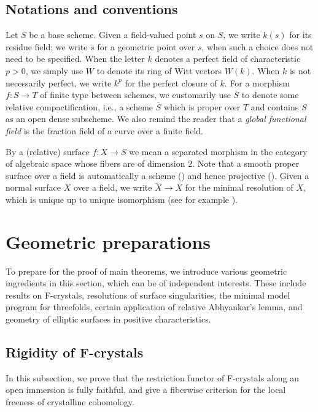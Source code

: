 \documentclass[11pt, letterpaper]{amsart}
\theoremstyle{plain}
\theoremstyle{definition}
\newcommand{\<}{\langle}
\renewcommand{\>}{\rangle}
\begin{document}
\subsection{Notations and conventions} 
Let $S$ be a base scheme. 
Given a field-valued point $s$ on $S$, we write $k(s)$ for its residue field; we write $\bar{s}$ for a geometric point over $s$, when such a choice does not need to be specified. 
When the letter $k$ denotes a perfect field of characteristic $p > 0$, we simply use $W$ to denote its ring of Witt vectors $W(k)$. 
When $k$ is not necessarily perfect, we write $k^p$ for the perfect closure of $k$.
For a morphism $f : S \to T$ of finite type between schemes, we customarily use $\overline{S}$ to denote some relative compactification, i.e., a scheme $\overline{S}$ which is proper over $T$ and contains $S$ as an open dense subscheme.
We also remind the reader that a \emph{global functional field} is the fraction field of a curve over a finite field.

By a (relative) surface $f : X \to S$ we mean a separated morphism in the category of algebraic space whose fibers are of dimension $2$. 
Note that a smooth proper surface over a field is automatically a scheme (\cite[Thm~4.7]{Artin-AS}) and hence projective (\cite[p.~328, Cor.~4]{Kl66}). 
Given a normal surface $X$ over a field, we write $\breve{X} \to X$ for the minimal resolution of $X$, which is unique up to unique isomorphism (see for example \cite[\S9.3.4, Prop.~3.32]{LiuBook}). 


\section{Geometric preparations}
To prepare for the proof of main theorems, we introduce various geometric ingredients in this section, which can be of independent interests.
These include results on F-crystals, resolutions of surface singularities, the minimal model program for threefolds, certain application of relative Abhyankar's lemma, and geometry of elliptic surfaces in positive characteristics.

\subsection{Rigidity of F-crystals}
\label{sub:F-crystal}
In this subsection, we prove that the restriction functor of F-crystals along an open immersion is fully faithful, and give a fiberwise criterion for the local freeness of crystalline cohomology.
\end{document}
